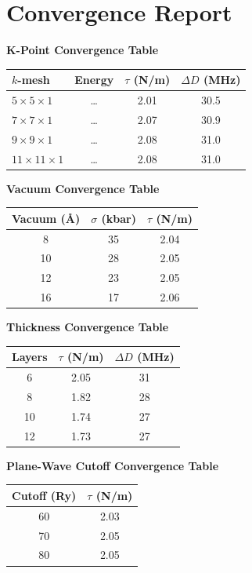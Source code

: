 \documentclass[11pt]{article}
\begin{document}
\section{Convergence Report}

\noindent\textbf{K-Point Convergence Table}

\begin{center}
\begin{tabular}{lccc}
\toprule
$k$-mesh & Energy & $\tau$ (N/m) & $\Delta D$ (MHz) \\
\midrule
$5\times5\times1$   & \ldots & 2.01 & 30.5 \\
$7\times7\times1$   & \ldots & 2.07 & 30.9 \\
$9\times9\times1$   & \ldots & 2.08 & 31.0 \\
$11\times11\times1$ & \ldots & 2.08 & 31.0 \\
\bottomrule
\end{tabular}
\end{center}

\noindent\textbf{Vacuum Convergence Table}

\begin{center}
\begin{tabular}{ccc}
\toprule
Vacuum (\AA) & $\sigma$ (kbar) & $\tau$ (N/m) \\
\midrule
8  & 35 & 2.04 \\
10 & 28 & 2.05 \\
12 & 23 & 2.05 \\
16 & 17 & 2.06 \\
\bottomrule
\end{tabular}
\end{center}

\noindent\textbf{Thickness Convergence Table}

\begin{center}
\begin{tabular}{ccc}
\toprule
Layers & $\tau$ (N/m) & $\Delta D$ (MHz) \\
\midrule
6  & 2.05 & 31 \\
8  & 1.82 & 28 \\
10 & 1.74 & 27 \\
12 & 1.73 & 27 \\
\bottomrule
\end{tabular}
\end{center}

\noindent\textbf{Plane-Wave Cutoff Convergence Table}

\begin{center}
\begin{tabular}{cc}
\toprule
Cutoff (Ry) & $\tau$ (N/m) \\
\midrule
60 & 2.03 \\
70 & 2.05 \\
80 & 2.05 \\
\bottomrule
\end{tabular}
\end{center}
\end{document}
